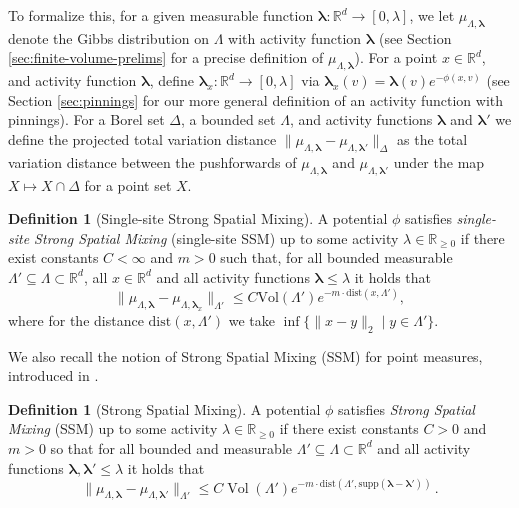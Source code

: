 \documentclass[10pt]{amsart}
\theoremstyle{definition}
\newtheorem{definition}[theorem]{Definition}
\theoremstyle{remark}
\newcommand{\Vol}{\operatorname{Vol}}
\newcommand{\blambda}{{\boldsymbol{\lambda}}}
\newcommand{\dist}{\mathrm{dist}}
\newcommand{\R}{\mathbb{R}}
\newcommand{\region}{\Lambda}
\newcommand{\potential}{\phi}
\newcommand{\activity}{\lambda}
\newcommand{\activities}{\pmb{\lambda}}
\newcommand{\vol}{\mathrm{Vol}}
\begin{document}
	To formalize this, for a given measurable function $\blambda: \R^d \to [0,\lambda]$, we let $\mu_{\Lambda,\blambda}$ denote the Gibbs distribution on $\Lambda$ with activity function $\blambda$ (see Section \ref{sec:finite-volume-prelims} for a precise definition of $\mu_{\Lambda,\blambda}$). 
	For a point $x \in \R^d$, and activity function $\blambda$, define $\blambda_x : \R^d \to [0,\lambda]$ via $\blambda_x(v) = \blambda(v) e^{-\phi(x,v)}$ (see Section \ref{sec:pinnings} for our more general definition of an activity function with pinnings).  For a Borel set $\Delta$, a bounded set $\Lambda$, and activity functions $\blambda$ and $\blambda'$ we define the projected total variation distance $\|\mu_{\Lambda,\blambda} -  \mu_{\Lambda,\blambda'}\|_{\Delta}$ as the total variation distance between the pushforwards of $\mu_{\Lambda,\blambda}$ and $\mu_{\Lambda,\blambda'}$ under the map $X \mapsto X \cap \Delta$ for a point set $X$.  
	
	
	
	
	
	\begin{definition}[Single-site Strong Spatial Mixing]\label{def:spatial_mixing}
		A potential $\potential$ satisfies \emph{single-site Strong Spatial Mixing} (single-site SSM)  up to some activity $\activity \in \R_{\ge 0}$ if there exist constants $C < \infty$ and $m > 0$ such that, for all bounded measurable $\region' \subseteq \region \subset \R^d$, all $x \in \R^d$ and all activity functions $\activities \le \activity$ it holds that 
		\[
		\|\mu_{\region, \activities} - \mu_{\region, \activities_x}\|_{\region'} \le C  \vol(\region')  e^{- m \cdot \dist(x, \region')},
		\]
		where for the distance $\dist(x, \region')$ we take $\inf\{\|x-y\|_2\mid y\in\Lambda'\}$.
	\end{definition}
	
	We also recall the notion of Strong Spatial Mixing (SSM) for point measures, introduced in \cite{michelen2022strong}.
	
	
	
	\begin{definition}[Strong Spatial Mixing] \label{def:SSM}
		A potential $\phi$ satisfies \emph{Strong Spatial Mixing} (SSM) up to some activity $\lambda \in \R_{\geq 0}$ if there exist constants $C > 0$ and $m > 0$ so that for all bounded and measurable $\Lambda' \subseteq \Lambda \subset \R^d$ and all activity functions $\blambda,\blambda' \leq \lambda$ it holds that $$\|\mu_{\Lambda,\blambda} - \mu_{\Lambda,\blambda'}\|_{\Lambda'} \leq C \Vol(\Lambda') e^{-m \cdot\dist(\Lambda', \mathrm{supp}(\blambda - \blambda'))}\,.$$
	\end{definition}
	
\end{document}
